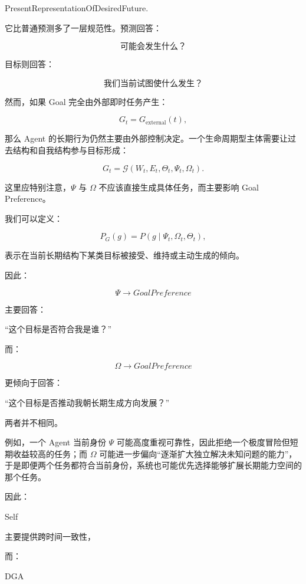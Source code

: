\begin{statementbox}
PresentRepresentationOfDesiredFuture.
\end{statementbox}

它比普通预测多了一层规范性。预测回答：

\[
\text{可能会发生什么？}
\]

目标则回答：

\[
\text{我们当前试图使什么发生？}
\]

然而，如果 Goal 完全由外部即时任务产生：

\[
G_t
=
G_{\mathrm{external}}(t),
\]

那么 Agent 的长期行为仍然主要由外部控制决定。一个生命周期型主体需要让过去结构和自我结构参与目标形成：

\[
G_t
=
\mathcal{G}
\left(
W_t,
E_t,
\Theta_t,
\Psi_t,
\Omega_t
\right).
\]

这里应特别注意，$\Psi$ 与 $\Omega$ 不应该直接生成具体任务，而主要影响 Goal Preference。

我们可以定义：

\[
P_G(g)
=
P
\left(
g
\mid
\Psi_t,\Omega_t,\Theta_t
\right),
\]

表示在当前长期结构下某类目标被接受、维持或主动生成的倾向。

因此：

\[
\boxed{
\Psi
\rightarrow
GoalPreference
}
\]

主要回答：

“这个目标是否符合我是谁？”

而：

\[
\boxed{
\Omega
\rightarrow
GoalPreference
}
\]

更倾向于回答：

“这个目标是否推动我朝长期生成方向发展？”

两者并不相同。

例如，一个 Agent 当前身份 $\Psi$ 可能高度重视可靠性，因此拒绝一个极度冒险但短期收益较高的任务；而 $\Omega$ 可能进一步偏向“逐渐扩大独立解决未知问题的能力”，于是即便两个任务都符合当前身份，系统也可能优先选择能够扩展长期能力空间的那个任务。

因此：

\begin{statementbox}
Self
\end{statementbox}

主要提供跨时间一致性，

而：

\begin{statementbox}
DGA
\end{statementbox}

